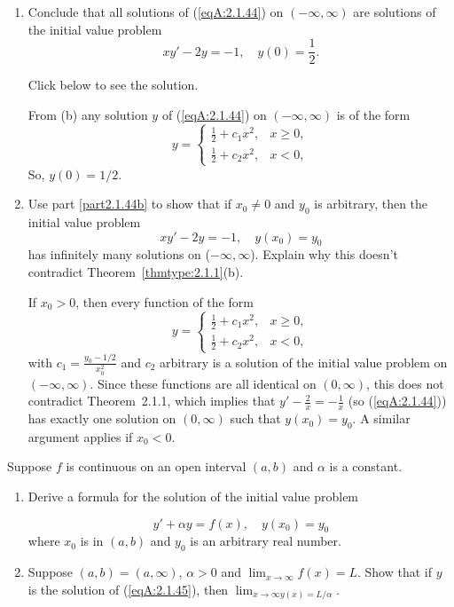 \documentclass{ximera}
\begin{document}
\begin{problem}
\begin{enumerate}
\item %
Conclude that all solutions of (\ref{eqA:2.1.44}) on
$(-\infty,\infty)$ are solutions of the initial value problem
$$
xy'-2y=-1,\quad y(0)=\frac{1}{2}.
$$

Click below to see the solution.

\begin{solution}
    From (b) any solution $y$ of (\ref{eqA:2.1.44}) on
$(-\infty,\infty)$ is of the form
$$
y=\left\{\begin{array}{ll}\frac{1}{2}+c_1x^2, &x
\ge 0,\\
\frac{1}{2}+c_2x^2, &x < 0,\end{array}\right.
$$
So,
$y(0)=1/2$.
\end{solution}

\item %
Use part \ref{part2.1.44b} to show that if  $x_0\neq 0$ and $y_0$  is arbitrary, then
  the  initial value problem
$$
xy'-2y=-1,\quad y(x_0)=y_0
$$
has infinitely many solutions on ($-\infty,\infty$). Explain why this
doesn't contradict  Theorem~\ref{thmtype:2.1.1}(b).



\begin{solution}
    If $x_0>0$, then every function of the form
$$
y=\left\{\begin{array}{ll}\frac{1}{2}+c_1x^2, &x
\ge 0,\\
\frac{1}{2}+c_2x^2, &x < 0,\end{array}\right.
$$
with $c_1=\frac{y_0-1/2}{x_0^2}$ and $c_2$
arbitrary is a solution of the initial value problem on
$(-\infty,\infty)$. Since these functions are all identical on
$(0,\infty)$, this does not contradict Theorem~2.1.1, which
implies that 
$y'-\frac{2}{x}=-\frac{1}{x}$ (so
(\ref{eqA:2.1.44})) has exactly one solution on $(0,\infty)$ such
that $y(x_0)=y_0$. A similar argument applies if $x_0<0$.
\end{solution}
\end{enumerate}
\end{problem}

\begin{problem}\label{exer:2.1.45}
Suppose $f$ is continuous on an open interval $(a,b)$
and $\alpha$ is a constant.
\begin{enumerate}
\item %
Derive a formula for the solution of the initial value
problem

\begin{equation}\label{eqA:2.1.45}
y'+\alpha y=f(x),\quad y(x_0)=y_0
\end{equation}
where $x_0$ is in $(a,b)$ and $y_0$ is an arbitrary real number.

\item %
Suppose $(a,b)=(a,\infty)$, $\alpha > 0$ and
$\lim_{x\to\infty} f(x)=L$. Show that if $y$ is the
solution of (\ref{eqA:2.1.45}), then $\lim_{x\to
\infty y(x)=L/\alpha}$.
\end{enumerate}
\end{problem}
\end{document}
